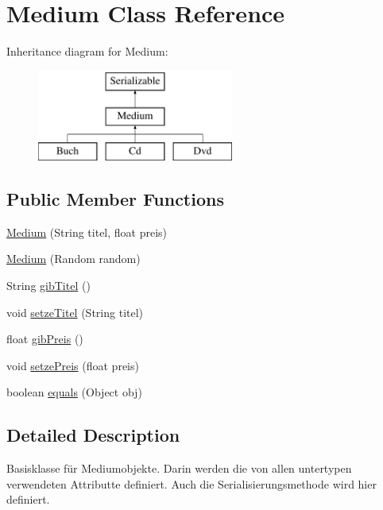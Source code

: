 \hypertarget{classMedium}{\section{Medium Class Reference}
\label{classMedium}
}
Inheritance diagram for Medium\-:\begin{figure}[H]
\begin{center}
\leavevmode
\includegraphics[height=3.000000cm]{classMedium}
\end{center}
\end{figure}
\subsection*{Public Member Functions}
\begin{DoxyCompactItemize}
\item 
\hyperlink{classMedium_a00549864dd88fc9c317504b7bd335701}{Medium} (String titel, float preis)
\item 
\hyperlink{classMedium_ac3b157358e6566a99d1de47c08836071}{Medium} (Random random)
\item 
String \hyperlink{classMedium_a07c01338a5027ca7b7034f0fd23fd196}{gib\-Titel} ()
\item 
void \hyperlink{classMedium_abc928f7f28de4a257a8be9e97d5e46d8}{setze\-Titel} (String titel)
\item 
float \hyperlink{classMedium_ac1434c472daefaf2af3775f957831919}{gib\-Preis} ()
\item 
void \hyperlink{classMedium_a7742ceb4b7ff5e850cb3f13afee4689f}{setze\-Preis} (float preis)
\item 
boolean \hyperlink{classMedium_a01d9c9999e0357603f822834978c2c5a}{equals} (Object obj)
\end{DoxyCompactItemize}


\subsection{Detailed Description}
Basisklasse für Mediumobjekte. Darin werden die von allen untertypen verwendeten Attributte definiert. Auch die Serialisierungsmethode wird hier definiert.

